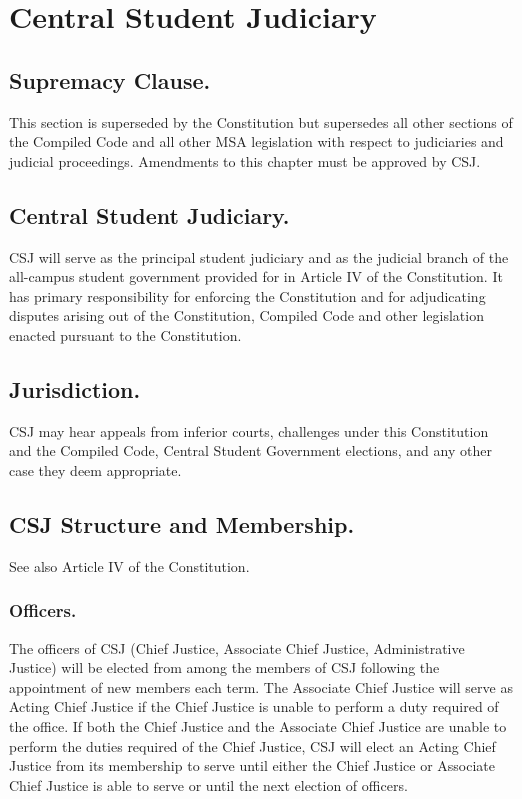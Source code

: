 
\section{Central Student Judiciary}

\subsection{Supremacy Clause.}
This section is superseded by the Constitution but supersedes all other sections of the Compiled Code and all other MSA legislation with respect to judiciaries and judicial proceedings.  Amendments to this chapter must be approved by CSJ.
\subsection{Central Student Judiciary.}
CSJ will serve as the principal student judiciary and as the judicial branch of the all-campus student government provided for in Article IV of the Constitution.  It has primary responsibility for enforcing the Constitution and for adjudicating disputes arising out of the Constitution, Compiled Code and other legislation enacted pursuant to the Constitution.
\subsection{Jurisdiction.}
CSJ may hear appeals from inferior courts, challenges under this Constitution and the Compiled Code, Central Student Government elections, and any other case they deem appropriate.

\subsection{CSJ Structure and Membership.}  See also Article IV of the Constitution.
\subsubsection{Officers.}
The officers of CSJ (Chief Justice, Associate Chief Justice, Administrative Justice) will be elected from among the members of CSJ following the appointment of new members each term.  The Associate Chief Justice will serve as Acting Chief Justice if the Chief Justice is unable to perform a duty required of the office.  If both the Chief Justice and the Associate Chief Justice are unable to perform the duties required of the Chief Justice, CSJ will elect an Acting Chief Justice from its membership to serve until either the Chief Justice or Associate Chief Justice is able to serve or until the next election of officers.
